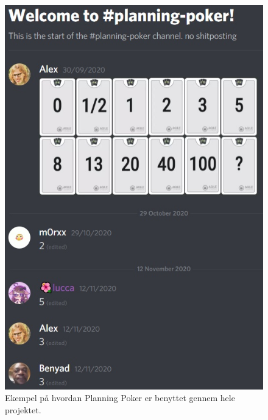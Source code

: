 \begin{figure}
    \includegraphics[width=\linewidth]{figures/planningpoker.jpg}
    \caption{Ekempel på hvordan Planning Poker er benyttet gennem hele projektet.}
    \label{fig:Poker}
\end{figure}

